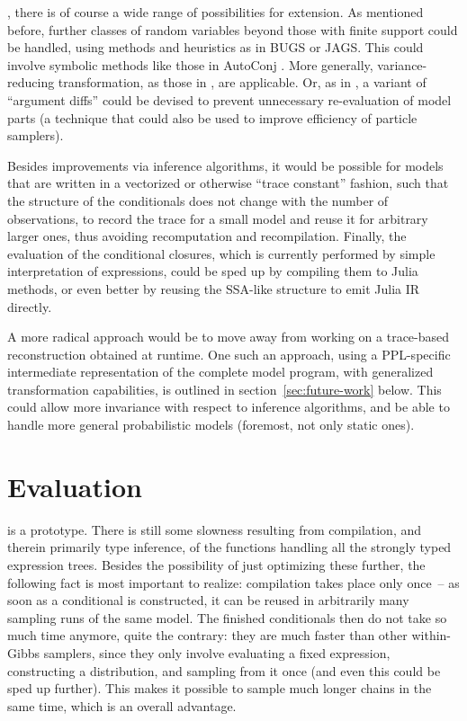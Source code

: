 , there is of course a wide range of possibilities for
extension.  As mentioned before, further classes of random variables beyond those with finite
support could be handled, using methods and heuristics as in BUGS or JAGS.  This could involve
symbolic methods like those in AutoConj \parencite{hoffman2018autoconj}. More generally,
variance-reducing transformation, as those in \textcite{murray2017delayed}, are applicable.
Or, as in , a variant of \enquote{argument diffs} could be devised to prevent
unnecessary re-evaluation of model parts \parencites[see][section
1.2.3]{cusumano-towner2020gen}{becker2020dynamic} (a technique that could also be used to improve
efficiency of particle samplers).

Besides improvements via inference algorithms, it would be possible for models that are written in a
vectorized or otherwise \enquote{trace constant} fashion, such that the structure of the
conditionals does not change with the number of observations, to record the trace for a small model
and reuse it for arbitrary larger ones, thus avoiding recomputation and recompilation.  Finally, the
evaluation of the conditional closures, which is currently performed by simple interpretation of
expressions, could be sped up by compiling them to Julia methods, or even better by reusing the
SSA-like structure to emit Julia IR directly.

A more radical approach would be to move away from working on a trace-based reconstruction obtained
at runtime. One such an approach, using a PPL-specific intermediate representation of the complete
model program, with generalized transformation capabilities, is outlined in
section~\ref{sec:future-work} below.  This could allow more invariance with respect to inference
algorithms, and be able to handle more general probabilistic models (foremost, not only static
ones).


\section{Evaluation}
\label{sec:autogibbs-eval}

\autogibbsjl{} is a prototype.  There is still some slowness resulting from compilation, and therein
primarily type inference, of the functions handling all the strongly typed expression trees.
Besides the possibility of just optimizing these further, the following fact is most important to
realize: compilation takes place only once~-- as soon as a conditional is constructed, it can be
reused in arbitrarily many sampling runs of the same model.  The finished conditionals then do not
take so much time anymore, quite the contrary: they are much faster than other within-Gibbs
samplers, since they only involve evaluating a fixed expression, constructing a distribution, and
sampling from it once (and even this could be sped up further).  This makes it possible to sample
much longer chains in the same time, which is an overall advantage.

